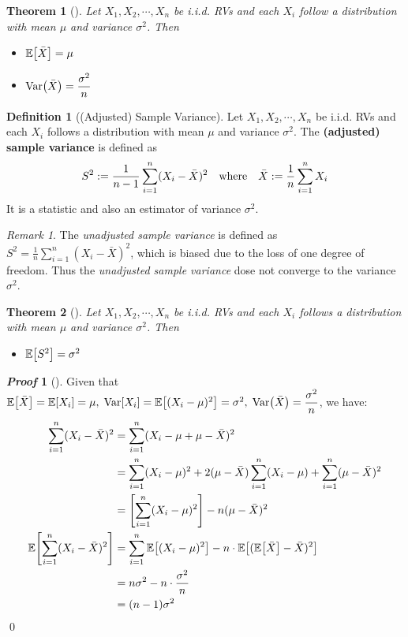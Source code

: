 \documentclass[10pt,UTF8]{article}
\newenvironment{definition box}
{\begin{tcolorbox}[colback=blue!5!white,colframe=blue!75!black,parbox=false,before upper=\par,before lower=\par]}
{\end{tcolorbox}}
\newenvironment{theorem box}
{\begin{tcolorbox}[colback=yellow!5!white,colframe=yellow!75!black,parbox=false,before upper=\par,before lower=\par]}
{\end{tcolorbox}}
\theoremstyle{definition}
\newtheorem{definition inner}{Definition}[section]
\newenvironment{definition}[1][]
{\begin{definition box}\begin{definition inner}[#1]\hfill\par}
{\end{definition inner}\end{definition box}}
\theoremstyle{plain}
\newtheorem{theorem inner}{Theorem}[section]
\newenvironment{theorem}[1][]
{\begin{theorem box}\begin{theorem inner}[#1]\hfill\par}
{\end{theorem inner}\end{theorem box}}
\theoremstyle{definition}
\newtheorem*{proof inner}{\textit{Proof}}
\renewenvironment{proof}[1][]
{\begin{proof inner}[#1]\hfill\par}
{\qed\end{proof inner}}
\theoremstyle{remark}
\newtheorem*{remark}{\textit{Remark}}
\newcommand{\E}[1]{\mathbb{E}\qty[#1]}  %
\newcommand{\Var}{\mathrm{Var}\qty}  %
\begin{document}
\begin{theorem}
    Let $X_1, X_2, \cdots, X_n$ be i.i.d. RVs and
    each $X_i$ follow a distribution with mean $\mu$ and variance $\sigma^2$.
    Then
    \begin{itemize}
        \item $\E{\bar{X}}=\mu$
        \item $\Var(\bar{X})=\dfrac{\sigma^2}{n}$
    \end{itemize}
\end{theorem}

\begin{definition}[(Adjusted) Sample Variance]
    Let $X_1, X_2, \cdots, X_n$ be i.i.d. RVs and
    each $X_i$ follows a distribution with mean $\mu$ and variance $\sigma^2$.
    The \textbf{(adjusted) sample variance} is defined as
    \begin{equation*}
        S^2 := \frac{1}{n-1}\sum_{i=1}^n (X_i - \bar{X})^2
        \qq{where} \bar{X} := \frac{1}{n}\sum_{i=1}^n X_i
    \end{equation*}
    It is a statistic and also an estimator of variance $\sigma^2$.
\end{definition}
\begin{remark}
    The \emph{unadjusted sample variance} is defined as
    $\displaystyle S^2 = \frac{1}{n}\sum_{i=1}^n (X_i - \bar{X})^2$,
    which is biased due to the loss of one degree of freedom.
    Thus the \emph{unadjusted sample variance} dose not
    converge to the variance $\sigma^2$.
\end{remark}

\begin{theorem}
    Let $X_1, X_2, \cdots, X_n$ be i.i.d. RVs and
    each $X_i$ follows a distribution with mean $\mu$ and variance $\sigma^2$.
    Then
    \begin{itemize}
        \item $\E{S^2}=\sigma^2$
    \end{itemize}
\end{theorem}
\begin{proof}
    Given that $\E{\bar{X}}=\E{X_i}=\mu,\;\Var[X_i]=\E{(X_i-\mu)^2}=\sigma^2,\;
    \Var(\bar{X})=\dfrac{\sigma^2}{n}$, we have:
    \begin{align*}
        \sum_{i=1}^n (X_i - \bar{X})^2
        &= \sum_{i=1}^n (X_i - \mu + \mu - \bar{X})^2 \\
        &= \sum_{i=1}^n (X_i - \mu)^2 + 2 (\mu - \bar{X})\sum_{i=1}^n (X_i - \mu)
        + \sum_{i=1}^n (\mu - \bar{X})^2 \\
        &= \left[\sum_{i=1}^n (X_i - \mu)^2\right] - n (\mu - \bar{X})^2 \\
        \E{\sum_{i=1}^n (X_i - \bar{X})^2}
        &= \sum_{i=1}^n \E{(X_i - \mu)^2} - n \cdot\E{(\E{\bar{X}} - \bar{X})^2} \\
        &= n\sigma^2 - n \cdot \frac{\sigma^2}{n} \\
        &= (n-1)\sigma^2
    \end{align*}
\end{proof}
\end{document}
